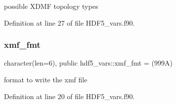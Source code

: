 possible X\+D\+MF topology types 



Definition at line 27 of file H\+D\+F5\+\_\+vars.\+f90.

\mbox{\label{namespacehdf5__vars_ad8665a0387dde737161d1162565aefa9}} 
\subsubsection{\texorpdfstring{xmf\+\_\+fmt}{xmf\_fmt}}
{\footnotesize\ttfamily character(len=6), public hdf5\+\_\+vars\+::xmf\+\_\+fmt = \textquotesingle{}(999\+A)\textquotesingle{}}



format to write the xmf file 



Definition at line 20 of file H\+D\+F5\+\_\+vars.\+f90.

